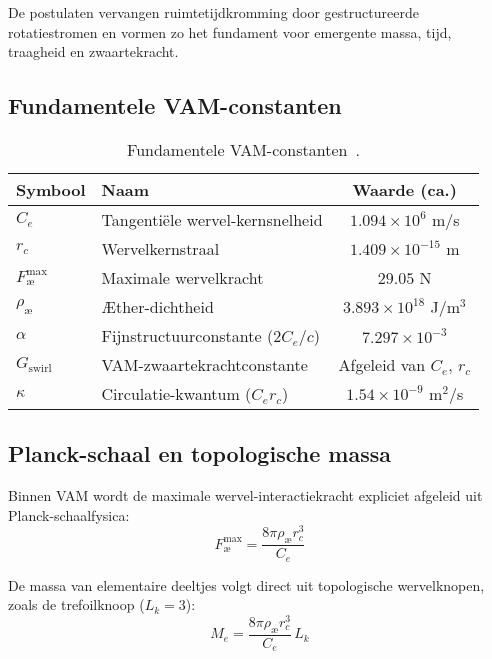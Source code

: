 De postulaten vervangen ruimtetijdkromming door gestructureerde rotatiestromen en vormen zo het fundament voor emergente massa, tijd, traagheid en zwaartekracht.

\subsection*{Fundamentele VAM-constanten}

\begin{table}[htbp]
    \centering
    \begin{tabular}{llc}
        \hline
        \toprule
        \textbf{Symbool} & \textbf{Naam} & \textbf{Waarde (ca.)} \\
        \hline
        \midrule
        $C_e$ & Tangentiële wervel-kernsnelheid & $1.094 \times 10^6$ m/s \\
        $r_c$ & Wervelkernstraal & $1.409 \times 10^{-15}$ m \\
        $F^{\text{max}}_{\text{\ae}}$ & Maximale wervelkracht & $29.05$ N \\
        $\rho_\text{\ae}$ & Æther-dichtheid & $3.893 \times 10^{18}$ J/m$^3$ \\
        $\alpha$ & Fijnstructuurconstante ($2 C_e/c$) & $7.297 \times 10^{-3}$\\
        $G_\text{swirl}$ & VAM-zwaartekrachtconstante & Afgeleid van $C_e$, $r_c$\\
        $\kappa$ & Circulatie-kwantum ($C_e r_c$) & $1.54 \times 10^{-9}$ m$^2$/s \\
        \hline
        \bottomrule
    \end{tabular}
    \caption{Fundamentele VAM-constanten~\cite{vam2025field}.}
    \label{tab:VAMconstants}
\end{table}

\subsection*{Planck-schaal en topologische massa}

Binnen VAM wordt de maximale wervel-interactiekracht expliciet afgeleid uit Planck-schaalfysica:
\begin{equation}
    F^{\text{max}}_{\text{\ae}} = \frac{8\pi \rho_\text{\ae} r_c^3}{C_e}
\end{equation}


De massa van elementaire deeltjes volgt direct uit topologische wervelknopen, zoals de trefoilknoop ($L_k=3$):
\begin{equation}
    M_e = \frac{8\pi \rho_\text{\ae} r_c^3}{C_e}\, L_k
\end{equation}



